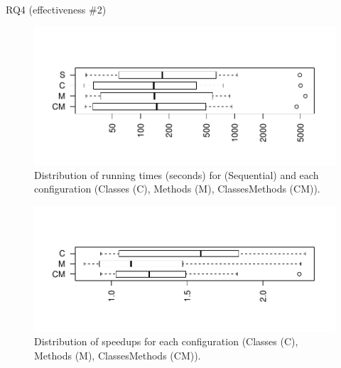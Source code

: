 \documentclass{beamer}
\begin{document}
\begin{frame}{RQ4 (effectiveness \#2)}
\vspace{-1.2cm}
\begin{figure}
	\centering
\includegraphics[width=\linewidth]{images/time.pdf}
\vspace{-1.4cm}
	\caption*{Distribution of \tname{} running times (seconds) for (Sequential) and each configuration (Classes (C), Methods (M), ClassesMethods (CM)).}
\end{figure}
\vspace{-1.25cm}\pause
\begin{figure}
	\centering
	\includegraphics[width=\linewidth]{images/speedup.pdf}
	\vspace{-1.6cm}
	\caption*{Distribution of speedups for each configuration (Classes (C), Methods (M), ClassesMethods (CM)).}
\end{figure}
\end{frame}
\end{document}
